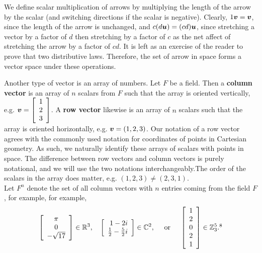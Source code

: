 \begin{Exam}
\noindent We define scalar multiplication of arrows by multiplying the length of the arrow by the scalar (and switching directions if the scalar is negative). Clearly, $1\boldsymbol v=\boldsymbol v$, since the length of the arrow is unchanged, and $c(d\boldsymbol u) = (cd)\boldsymbol u$, since stretching a vector by a factor of $d$ then stretching by a factor of $c$ as the net affect of stretching the arrow by a factor of $cd$. It is left as an exercise of the reader to prove that two distributive laws. Therefore, the set of arrow in space forms a vector space under these operations.
\end{Exam}\vs

\begin{Exam}
Another type of vector is an array of numbers. Let $F$ be a field. Then a \textbf{column vector} is an array of $n$ scalars from $F$ such that the array is oriented vertically, e.g. $\boldsymbol v = \left[\begin{array}{r} 1\\2\\3 \end{array}\right]$. A \textbf{row vector} likewise is an array of $n$ scalars such that the array is oriented horizontally, e.g.  $\boldsymbol v =(1, 2, 3)$. Our notation of a row vector agrees with the commonly used  notation  for coordinates of points in Cartesian geometry. As such, we naturally identify these arrays of scalars with points in space. The difference between row vectors and column vectors is purely notational, and we will use the two notations interchangeably.\footnotemark[2]  The order of the scalars in the array does matter, e.g. $(1, 2, 3) \neq (2,3, 1)$.\\

Let $F^n$ denote the set of all column vectors with $n$ entries coming from the field $F$, for example, for example, \[\mtx{c}{\pi\\ 0\\ -\sqrt{17}} \in \R^3,\quad \vr{1-2i \\  \frac{1}{2}-\frac{5}{2}i}\in \C^2,\quad \text{ or }\quad \vr{1\\2\\0\\2\\1}\in \Z_3^5.\footnotemark[8]\]


\end{Exam}
